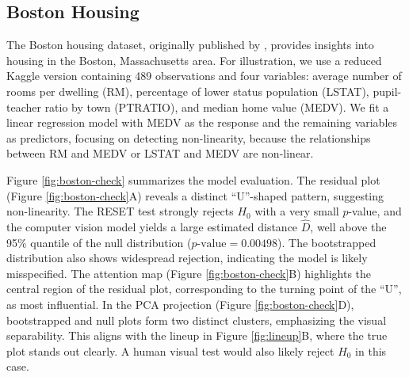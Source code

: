 \documentclass[]{interact}
\theoremstyle{plain}%
\theoremstyle{definition}
\theoremstyle{remark}
\begin{document}
\subsection{Boston Housing}\label{boston-housing}

The Boston housing dataset, originally published by
\citet{harrison1978hedonic}, provides insights into housing in the
Boston, Massachusetts area. For illustration, we use a reduced Kaggle
version containing 489 observations and four variables: average number
of rooms per dwelling (RM), percentage of lower status population
(LSTAT), pupil-teacher ratio by town (PTRATIO), and median home value
(MEDV). We fit a linear regression model with MEDV as the response and
the remaining variables as predictors, focusing on detecting
non-linearity, because the relationships between RM and MEDV or LSTAT
and MEDV are non-linear.

Figure \ref{fig:boston-check} summarizes the model evaluation. The
residual plot (Figure \ref{fig:boston-check}A) reveals a distinct
``U''-shaped pattern, suggesting non-linearity. The RESET test strongly
rejects \(H_0\) with a very small \(p\)-value, and the computer vision
model yields a large estimated distance \(\hat{D}\), well above the 95\%
quantile of the null distribution (\(p\text{-value} = 0.00498\)). The
bootstrapped distribution also shows widespread rejection, indicating
the model is likely misspecified. The attention map (Figure
\ref{fig:boston-check}B) highlights the central region of the residual
plot, corresponding to the turning point of the ``U'', as most
influential. In the PCA projection (Figure \ref{fig:boston-check}D),
bootstrapped and null plots form two distinct clusters, emphasizing the
visual separability. This aligns with the lineup in Figure
\ref{fig:lineup}B, where the true plot stands out clearly. A human
visual test would also likely reject \(H_0\) in this case.
\end{document}
